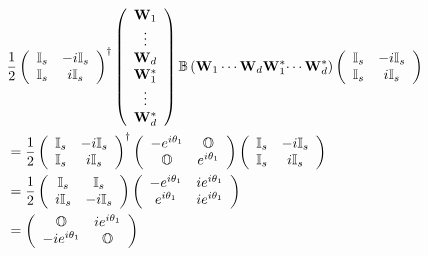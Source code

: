 \documentclass[aps,preprint]{revtex4}%
\begin{document}
\begin{align*}
&  \frac{1}{2}\left(
\begin{array}
[c]{cc}%
\mathbb{I}_{s} & -i\mathbb{I}_{s}\\
\mathbb{I}_{s} & i\mathbb{I}_{s}%
\end{array}
\right)  ^{\dagger}\left(
\begin{array}
[c]{c}%
\mathbf{W}_{1}\\
\vdots\\
\mathbf{W}_{d}\\
\mathbf{W}_{1}^{\ast}\\
\vdots\\
\mathbf{W}_{d}^{\ast}%
\end{array}
\right)  \mathbb{B}\left(  \mathbf{W}_{1}\cdots\mathbf{W}_{d}\mathbf{W}%
_{1}^{\ast}\mathbf{\cdots W}_{d}^{\ast}\right)  \left(
\begin{array}
[c]{cc}%
\mathbb{I}_{s} & -i\mathbb{I}_{s}\\
\mathbb{I}_{s} & i\mathbb{I}_{s}%
\end{array}
\right) \\
&  =\frac{1}{2}\left(
\begin{array}
[c]{cc}%
\mathbb{I}_{s} & -i\mathbb{I}_{s}\\
\mathbb{I}_{s} & i\mathbb{I}_{s}%
\end{array}
\right)  ^{\dagger}\left(
\begin{array}
[c]{cc}%
-e^{i\theta_{1}} & \mathbb{O}\\
\mathbb{O} & e^{i\theta_{1}}%
\end{array}
\right)  \left(
\begin{array}
[c]{cc}%
\mathbb{I}_{s} & -i\mathbb{I}_{s}\\
\mathbb{I}_{s} & i\mathbb{I}_{s}%
\end{array}
\right) \\
&  =\frac{1}{2}\left(
\begin{array}
[c]{cc}%
\mathbb{I}_{s} & \mathbb{I}_{s}\\
i\mathbb{I}_{s} & -i\mathbb{I}_{s}%
\end{array}
\right)  \left(
\begin{array}
[c]{cc}%
-e^{i\theta_{1}} & ie^{i\theta_{1}}\\
e^{i\theta_{1}} & ie^{i\theta_{1}}%
\end{array}
\right) \\
&  =\left(
\begin{array}
[c]{cc}%
\mathbb{O} & ie^{i\theta_{1}}\\
-ie^{i\theta_{1}} & \mathbb{O}%
\end{array}
\right)
\end{align*}%
\end{document}
